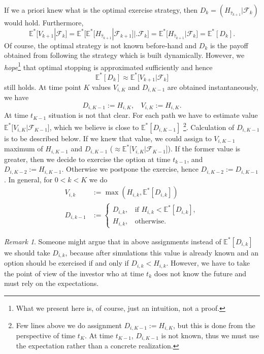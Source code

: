 \documentclass[a4paper,11pt, twoside]{book}
\theoremstyle{definition}
\theoremstyle{remark}
\newtheorem{remark}{Remark}[chapter]
\def\Em{{\mathbb{E}^*}}
\def\bpipe{{\bigl|\bigr.}}
\begin{document}
If we a priori knew what is the optimal exercise strategy, then $D_{k} = (H_{\hat{\tau}_{k+1}} | \mathcal{F}_{k})$ would hold. Furthermore,
\begin{equation}
 \label{eq:LSM_futurePayoff}
 \Em\bigl[ V_{k+1} | \mathcal{F}_{k} \bigr] = \Em\bigl[ \Em[H_{\hat{\tau}_{k+1}} | \mathcal{F}_{k+1}] \bpipe \mathcal{F}_{k} \bigr] = \Em\bigl[ H_{\hat{\tau}_{k+1}} | \mathcal{F}_k \bigr] = \Em[ D_{k} ]. 
\end{equation}
Of course, the optimal strategy is not known before-hand and $D_k$ is the payoff obtained from following the strategy which is built dynamically. However, we \emph{hope}\footnote{What we present here is, of course, just an intuition, not a proof.} that optimal stopping is approximated sufficiently and hence
\[ \Em[ D_{k} ] \approx  \Em\bigl[ V_{k+1} | \mathcal{F}_{k} \bigr] \]
still holds. At time point $K$ values $V_{i,K}$ and $D_{i,K-1}$ are obtained instantaneously, we have
\[ D_{i,K-1} := H_{i,K},\ \ \ \ V_{i,K} := H_{i,K}.\]
At time $t_{K-1}$ situation is not that clear. For each path we have to estimate value $\Em\bigl[ V_{i,K} | \mathcal{F}_{K-1} \bigr]$, which we believe is close to $\Em[D_{i,K-1}]$ \footnote{Few lines above we do assignment $D_{i,K-1} := H_{i,K}$, but this is done from the perspective of time $t_K$. At time $t_{K-1}$, $D_{i,K-1}$ is not known, thus we must use the expectation rather than a concrete realization.}. Calculation of $D_{i,K-1}$ is to be described below. If we knew that value, we could assign to $V_{i,K-1}$ maximum of $H_{i,K-1}$ and $D_{i,K-1}$ ($\approx \Em\bigl[ V_{i,K} | \mathcal{F}_{K-1} \bigr]$). If the former value is greater, then we decide to exercise the option at time $t_{k-1}$, and $D_{i,K-2} := H_{i,K-1}$. Otherwise we postpone the exercise, hence $D_{i,K-2} := D_{i,K-1}$. In general, for $0 < k < K$ we do
\begin{align*}
 V_{i,k} &:= \max(H_{i,k}, \Em[D_{i,k}]) \\
 D_{i,k-1} &:= \begin{cases}
                 D_{i,k},\ \ \ \ \text{if } H_{i,k} < \Em[D_{i,k}], \\
                 H_{i,k},\ \ \ \ \text{otherwise.}
               \end{cases}
\end{align*}
\begin{remark}
 Someone might argue that in above assignments instead of $\Em[D_{i,k}]$ we should take $D_{i,k}$, because after simulations this value is already known and an option should be exercised if and only if $D_{i,k} < H_{i,k}$. However, we have to take the point of view of the investor who at time $t_k$ does not know the future and must rely on the expectations. 
\end{remark}
\end{document}
